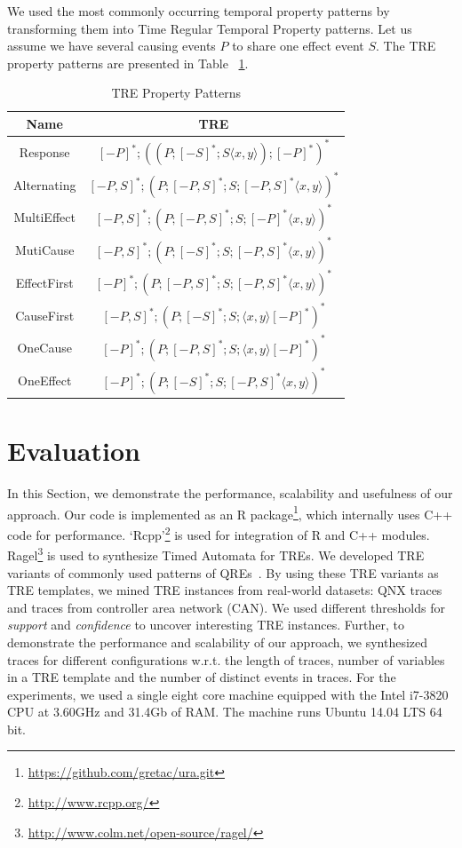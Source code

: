 \documentclass[]{sigplanconf}
\begin{document}
We used the most commonly occurring temporal property patterns \cite{evans} by transforming them into Time Regular Temporal Property patterns. Let us assume we have several causing events $P$ to share one effect event $S$. The TRE property patterns are presented in Table ~\ref{TRE_Exp}.
\begin{table}[ht]
  \centering
  \begin{tabular}{|c|c|}
  \hline
  \textbf{Name} & \textbf{TRE}  \\ \hline
  Response      & $[-P]^*;((P;[-S]^*;S \langle x,y \rangle);[-P]^*)^*$        \\ \hline
  Alternating   & $[-P,S]^*;(P;[-P,S]^*;S;[-P,S]^* \langle x,y \rangle)^*$       \\ \hline
  MultiEffect   &  $[-P,S]^*;(P;[-P,S]^*;S;[-P]^* \langle x,y \rangle)^*$     \\ \hline
  MutiCause     &  $[-P,S]^*;(P;[-S]^*;S;[-P,S]^* \langle x,y \rangle)^*$     \\ \hline
  EffectFirst   &  $[-P]^*;(P;[-P,S]^*;S;[-P,S]^* \langle x,y \rangle)^*$      \\ \hline
  CauseFirst    &  $[-P,S]^*;(P;[-S]^*;S;\langle x,y \rangle [-P]^*)^*$       \\ \hline
  OneCause      &  $[-P]^*;(P;[-P,S]^*;S;\langle x,y \rangle [-P]^*)^*$       \\ \hline
  OneEffect     &  $[-P]^*;(P;[-S]^*;S;[-P,S]^* \langle x,y \rangle)^*$       \\ \hline
\end{tabular}
\caption{TRE Property Patterns}\label{TRE_Exp}
\end{table}


\section{Evaluation}
In this Section, we demonstrate the performance, scalability and usefulness of our approach. Our code is implemented as an R package\footnote{\url{https://github.com/gretac/ura.git}}, which internally uses C++ code for performance. `Rcpp'\footnote{\url{http://www.rcpp.org/}} is used for integration of R and  C++ modules. Ragel\footnote{\url{http://www.colm.net/open-source/ragel/}} is used to synthesize Timed Automata for TREs. We developed TRE variants of commonly used patterns of QREs~\cite{DBLP:conf/paste/YangE04}. By using these TRE variants as TRE templates, we mined TRE instances from real-world datasets: QNX traces and traces from controller area network (CAN). We used different thresholds for \emph{support} and \emph{confidence} to uncover interesting TRE instances. Further, to demonstrate the performance and scalability of our approach, we synthesized traces for different configurations w.r.t. the length of traces, number of variables in a TRE template and the number of distinct events in traces. For the experiments, we used a single eight core machine equipped with the Intel i7-3820 CPU at 3.60GHz and 31.4Gb of RAM. The machine runs Ubuntu 14.04 LTS 64 bit.
\end{document}
